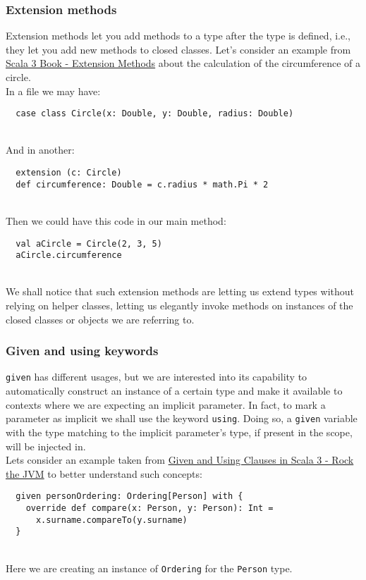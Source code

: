 \subsubsection{Extension methods}
Extension methods let you add methods to a type after the type is defined, i.e., they let you add new methods to closed classes.
Let's consider an example from \href{https://docs.scala-lang.org/scala3/book/ca-extension-methods.html}{Scala 3 Book - Extension Methods} about the calculation of the circumference of a circle.\\
In a file we may have:
\begin{verbatim}
  case class Circle(x: Double, y: Double, radius: Double)
\end{verbatim}\mbox{}\\
And in another:
\begin{verbatim}
  extension (c: Circle)
  def circumference: Double = c.radius * math.Pi * 2
\end{verbatim}\mbox{}\\
Then we could have this code in our main method:
\begin{verbatim}
  val aCircle = Circle(2, 3, 5)
  aCircle.circumference
\end{verbatim}\mbox{}\\
We shall notice that such extension methods are letting us extend types without relying on helper classes, letting us elegantly invoke methods on instances of the closed classes or objects we are referring to.

\subsubsection{Given and using keywords}
\texttt{given} has different usages, but we are interested into its capability to automatically construct an instance of a certain type and make it available to contexts where we are expecting an implicit parameter.
In fact, to mark a parameter as implicit we shall use the keyword \texttt{using}.
Doing so, a \texttt{given} variable with the type matching to the implicit parameter's type, if present in the scope, will be injected in.\\
Lets consider an example taken from \href{https://blog.rockthejvm.com/scala-3-given-using/}{Given and Using Clauses in Scala 3 - Rock the JVM} to better understand such concepts:
\begin{verbatim}
  given personOrdering: Ordering[Person] with {
    override def compare(x: Person, y: Person): Int = 
      x.surname.compareTo(y.surname)
  }
\end{verbatim}\mbox{}\\
Here we are creating an instance of \texttt{Ordering} for the \texttt{Person} type.



